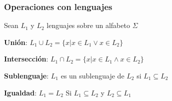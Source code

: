\begin{frame}
  \frametitle{Operaciones con lenguajes}
			  Sean $L_1$ y $L_2$ lenguajes sobre un alfabeto $\Sigma$
      \pause

      \begin{defi}
			\textbf{Unión}: $L_1 \cup L_2 = \{x | x \in L_1 \vee x \in L_2\}$
			\end{defi}
      \pause

      \begin{defi}
			\textbf{Intersección}: $L_1 \cap L_2 = \{x | x \in L_1 \wedge x \in L_2\}$
			\end{defi}
      \pause

      \begin{defi}
			\textbf{Sublenguaje}: $L_1$ es un sublenguaje de $L_2$ si $L_1 \subseteq L_2$
			\end{defi}
      \pause

      \begin{defi}
			\textbf{Igualdad}: $L_1 = L_2$ Si $L_1 \subseteq L_2$ y $L_2 \subseteq L_1$
			\end{defi}
\end{frame}
